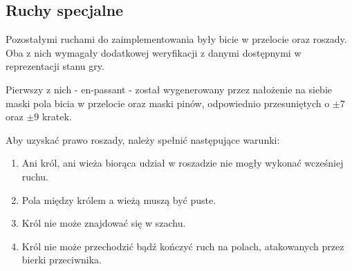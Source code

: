 \subsection{Ruchy specjalne}
\label{subsec:ruchy-specjalne}

Pozostałymi ruchami do zaimplementowania były bicie w przelocie oraz roszady.
Oba z nich wymagały dodatkowej weryfikacji z danymi dostępnymi w reprezentacji stanu gry.

Pierwszy z nich - en-passant - został wygenerowany przez nałożenie na siebie maski pola bicia w przelocie oraz maski pinów, odpowiednio przesuniętych o $\pm 7$ oraz $\pm 9$ kratek.

Aby uzyskać prawo roszady, należy spełnić następujące warunki:
\begin{enumerate}
    \item Ani król, ani wieża biorąca udział w roszadzie nie mogły wykonać wcześniej ruchu.
    \item Pola między królem a wieżą muszą być puste.
    \item Król nie może znajdować się w szachu.
    \item Król nie może przechodzić bądź kończyć ruch na polach, atakowanych przez bierki przeciwnika.
\end{enumerate}



